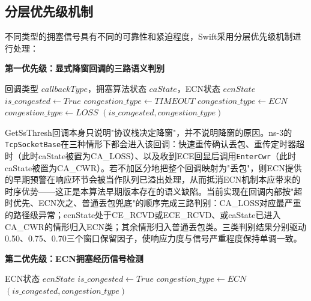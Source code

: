 \subsection{分层优先级机制}

不同类型的拥塞信号具有不同的可靠性和紧迫程度，Swift采用分层优先级机制进行处理：

\textbf{第一优先级：显式降窗回调的三路语义判别}

\begin{algorithm}[htbp]
\caption{显式降窗回调的三路语义判别}
\begin{algorithmic}[1]
\Require 回调类型 $callbackType$，拥塞算法状态 $caState$，ECN状态 $ecnState$
 
    \State $is\_congested \leftarrow True$
        \State $congestion\_type \leftarrow TIMEOUT$ 
        \State $congestion\_type \leftarrow ECN$ 
    \Else
        \State $congestion\_type \leftarrow LOSS$ 
    \EndIf
    \State \Return $(is\_congested, congestion\_type)$
\EndIf
\end{algorithmic}
\end{algorithm}

GetSsThresh回调本身只说明"协议栈决定降窗"，并不说明降窗的原因。ns-3的\texttt{TcpSocketBase}在三种情形下都会进入该回调：快速重传确认丢包、重传定时器超时（此时caState被置为CA\_LOSS）、以及收到ECE回显后调用\texttt{EnterCwr}（此时caState被置为CA\_CWR）。若不加区分地把整个回调映射为"丢包"，则ECN提供的早期预警在响应环节会被当作队列已溢出处理，从而抵消ECN机制本应带来的时序优势——这正是本算法早期版本存在的语义缺陷。当前实现在回调内部按"超时优先、ECN次之、普通丢包兜底"的顺序完成三路判别：CA\_LOSS对应最严重的路径级异常；ecnState处于CE\_RCVD或ECE\_RCVD、或caState已进入CA\_CWR的情形归入ECN类；其余情形归入普通丢包类。三类判别结果分别驱动0.50、0.75、0.70三个窗口保留因子，使响应力度与信号严重程度保持单调一致。

\textbf{第二优先级：ECN拥塞经历信号检测}

\begin{algorithm}[htbp]
\caption{ECN拥塞经历信号检测}
\begin{algorithmic}[1]
\Require ECN状态 $ecnState$
    \State $is\_congested \leftarrow True$
    \State $congestion\_type \leftarrow ECN$
    \State \Return $(is\_congested, congestion\_type)$
\EndIf
\end{algorithmic}
\end{algorithm}

